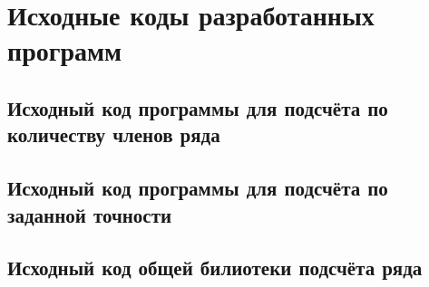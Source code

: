 \section{Исходные коды разработанных программ}

\subsection{Исходный код программы для подсчёта по количеству членов ряда}


\subsection{Исходный код программы для подсчёта по заданной точности}


\subsection{Исходный код общей билиотеки подсчёта ряда}


